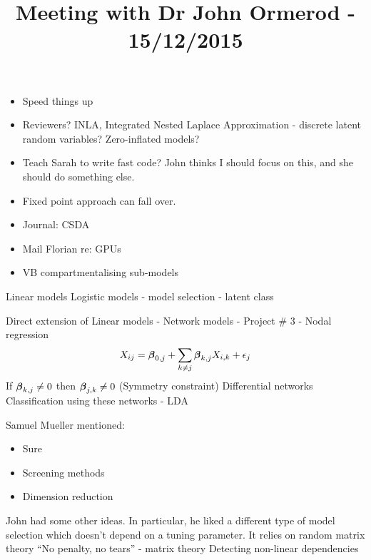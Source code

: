 \documentclass{amsart}
\title{Meeting with Dr John Ormerod - 15/12/2015}
\begin{document}
\maketitle

\begin{itemize}
\item Speed things up
\item Reviewers? INLA, Integrated Nested Laplace Approximation - discrete latent random variables? Zero-inflated models?
\item Teach Sarah to write fast code? John thinks I should focus on this, and she should do something else.
\item Fixed point approach can fall over.
\item Journal: CSDA
\item Mail Florian re: GPUs
\item VB compartmentalising sub-models
\end{itemize}

Linear models
Logistic models
- model selection
- latent class

Direct extension of Linear models - Network models - Project \# 3
 - Nodal regression
$$X_{ij} = {\boldsymbol \beta}_{0, j} + \sum_{k \ne j} {\boldsymbol \beta}_{k, j} X_{i, k} + \epsilon_j$$
If ${\boldsymbol \beta}_{k, j} \ne 0$ then ${\boldsymbol \beta}_{j, k} \ne 0$ (Symmetry constraint)
Differential networks
Classification using these networks - LDA

Samuel Mueller mentioned:
\begin{itemize}
\item Sure
\item Screening methods
\item Dimension reduction
\end{itemize}

John had some other ideas. In particular, he liked a different type of model selection which doesn't depend
on a tuning parameter.
It relies on random matrix theory
``No penalty, no tears'' - matrix theory
Detecting non-linear dependencies
\end{document}
